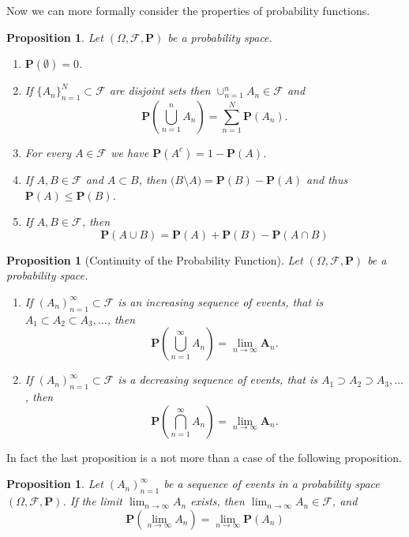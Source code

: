 \documentclass[11pt,a4paper]{article}
\theoremstyle{definition}
\theoremstyle{plain}
\newtheorem{proposition}[theorem]{Proposition}
\begin{document}
  Now we can more formally consider the properties of probability functions.
  \begin{proposition}
    Let $(\Omega, \mathcal F, \mathbf P)$ be a probability space.
    \begin{enumerate}
      \item $\mathbf P(\emptyset) = 0$.
      \item If $\{A_n\}_{n=1}^{N} \subset \mathcal F$ are disjoint sets then
        $\cup_{n=1}^{n}{A_n} \in \mathcal F$ and
        \[
          \mathbf P\left(\bigcup_{n=1}^{n}{A_n}\right) = 
          \sum_{n=1}^{N}{\mathbf P(A_n)}.
        \]
      \item For every $A \in \mathcal F$ we have 
        $\mathbf P(A^c) = 1 - \mathbf P(A)$.
      \item If $A, B \in \mathcal F$ and $A \subset B$, then 
        $\mathbf(B \setminus A) = \mathbf P(B) - \mathbf P(A)$ and thus
        $\mathbf P(A) \le \mathbf P(B)$.
      \item If $A,B \in \mathcal F$, then
        \[
          \mathbf P(A \cup B) = 
          \mathbf P(A) + \mathbf P(B) - \mathbf P(A \cap B)
        \]
    \end{enumerate}
  \end{proposition}
  
  \begin{proposition}[Continuity of the Probability Function]
    Let $(\Omega, \mathcal F, \mathbf P)$ be a probability space.
    \begin{enumerate}
      \item If $(A_n)_{n=1}^{\infty} \subset \mathcal F$ is an increasing
        sequence of events, that is $A_1 \subset A_2 \subset A_3, \dots$,
        then
        \[
          \mathbf P\left(\bigcup_{n=1}^{\infty}{A_n}\right) = 
          \lim_{n \to \infty}{\mathbf A_n}.
        \]
      \item If $(A_n)_{n=1}^{\infty} \subset \mathcal F$ is a decreasing
        sequence of events, that is $A_1 \supset A_2 \supset A_3, \dots$,
        then
        \[
          \mathbf P\left(\bigcap_{n=1}^{\infty}{A_n}\right) = 
          \lim_{n \to \infty}{\mathbf A_n}.
        \]
    \end{enumerate}
  \end{proposition}

  In fact the last proposition is a not more than a case of the following
  proposition.

  \begin{proposition}
    Let $(A_n)_{n=1}^{\infty}$ be a sequence of events in a probability space
    $(\Omega, \mathcal F, \mathbf P)$. If the limit $\lim_{n \to \infty} A_n$
    exists, then $\lim_{n \to \infty} A_n \in \mathcal F$, and
    \[
      \mathbf P(\lim_{n \to \infty}{A_n}) = 
      \lim_{n \to \infty} \mathbf P(A_n)
    \]
  \end{proposition}
  
\end{document}
